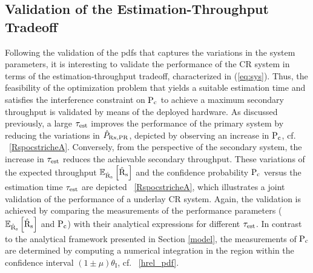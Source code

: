 \subsection{Validation of the Estimation-Throughput Tradeoff}
Following the validation of the pdfs that captures the variations in the system parameters, it is interesting to validate the performance of the CR system in terms of the estimation-throughput tradeoff, characterized in (\ref{eq:sys}). Thus, the feasibility of the optimization problem that yields a suitable estimation time and satisfies the interference constraint on $\text{P}_{\text{c}}$ to achieve a maximum secondary throughput is validated by means of the deployed hardware. As discussed previously, a large $\tau_{\text{est}}$ improves the performance of the primary system by reducing the variations in $\hat{P}_{\text{Rx,PR}}$, depicted by observing an increase in $\text{P}_{\text{c}}$, cf. \figurename~\ref{RspocstricheA}. Conversely, from the perspective of the secondary system, the increase in $\tau_{\text{est}}$ reduces the achievable secondary throughput. These variations of the expected throughput ${\mathbb E}_{\hat{\text{{R}}}_{\text{s}}}\left[ \hat{\text{{R}}}_{\text{s}} \right]$ and the confidence probability $\text{P}_{\text{c}}$ versus the estimation time $\tau_{\text{est}}$ are depicted \figurename~\ref{RspocstricheA}, which illustrates a joint validation of the performance of a underlay CR system. Again, the validation is achieved by comparing the measurements of the performance parameters (${\mathbb E}_{\hat{\text{{R}}}_{\text{s}}}\left[ \hat{\text{{R}}}_{\text{s}} \right]$ and $\text{P}_{\text{c}}$) with their analytical expressions for different $\tau_{\text{est}}$. In contrast to the analytical framework presented in Section \ref{model}, the measurements of $\text{P}_{\text{c}}$ are determined by computing a numerical integration in the region within the confidence interval $(1  \pm \mu)  \theta_\textrm{I}$, cf. \figurename~\ref{hrel_pdf}. 

